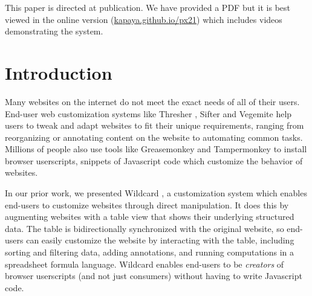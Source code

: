 \documentclass[sigconf,10pt]{acmart}
\begin{document}



\maketitle

This paper is directed at publication. We have provided a PDF but it is best viewed in the online version (\href{https://kapaya.github.io/px21/}{kapaya.github.io/px21}) which includes videos demonstrating the system.

\hypertarget{sec:introduction}{%
\section{Introduction}\label{sec:introduction}}

Many websites on the internet do not meet the exact needs of all of
their users. End-user web customization systems like Thresher
\citep{hogue2005}, Sifter \citep{huynh2006} and Vegemite \citep{lin2009}
help users to tweak and adapt websites to fit their unique requirements,
ranging from reorganizing or annotating content on the website to
automating common tasks. Millions of people also use tools like
Greasemonkey \citep{zotero-90} and Tampermonkey \citep{zotero-92} to
install browser userscripts, snippets of Javascript code which customize
the behavior of websites.

In our prior work, we presented Wildcard \citep{litt2020a, litt2020b}, a
customization system which enables end-users to customize websites
through direct manipulation. It does this by augmenting websites with a
table view that shows their underlying structured data. The table is
bidirectionally synchronized with the original website, so end-users can
easily customize the website by interacting with the table, including
sorting and filtering data, adding annotations, and running computations
in a spreadsheet formula language. Wildcard enables end-users to be
\emph{creators} of browser userscripts (and not just consumers) without
having to write Javascript code.
\end{document}
